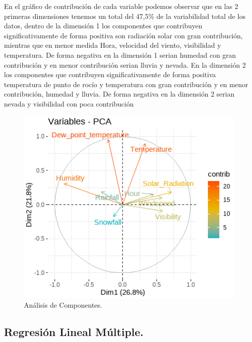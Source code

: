 \documentclass[]{elsarticle} %
\begin{document}
En el gráfico de contribución de cada variable podemos observar que en
las 2 primeras dimensiones tenemos un total del 47,5\% de la
variabilidad total de los datos, dentro de la dimensión 1 los
componentes que contribuyen significativamente de forma positiva son
radiación solar con gran contribución, mientras que en menor medida
Hora, velocidad del viento, visibilidad y temperatura. De forma negativa
en la dimensión 1 serian humedad con gran contribución y en menor
contribución serian lluvia y nevada. En la dimensión 2 los componentes
que contribuyen significativamente de forma positiva temperatura de
punto de rocío y temperatura con gran contribución y en menor
contribución, humedad y lluvia. De forma negativa en la dimensión 2
serian nevada y visibilidad con poca contribución

\begin{figure}[H]

{\centering \includegraphics[width=1\linewidth]{cp2} 

}

\caption{\label{fig:fig2}Análisis de Componentes.}\label{fig:fig2}
\end{figure}

\newpage
\subsection{Regresión Lineal Múltiple.}
\end{document}
